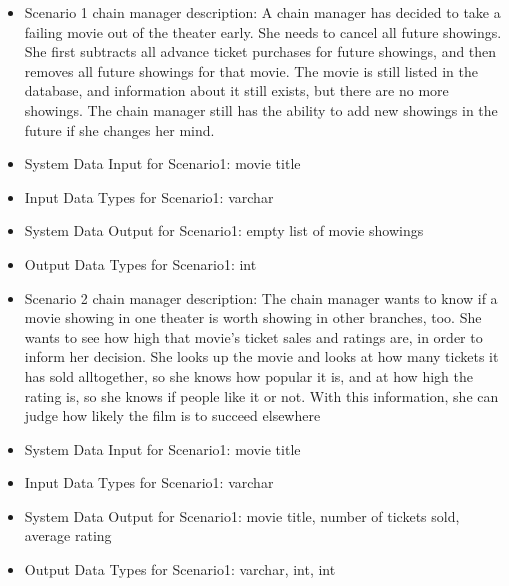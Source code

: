 {\begin{itemize}
\begin{itemize}
\begin{itemize}
	\item{Scenario 1 chain manager description: }
	A chain manager has decided to take a failing movie out of the theater early.  She needs to cancel all future showings.  She first subtracts all advance ticket purchases for future showings, and then removes all future showings for that movie.  The movie is still listed in the database, and information about it still exists, but there are no more showings.  The chain manager still has the ability to add new showings in the future if she changes her mind.
	\item{System Data Input for Scenario1: }
	movie title
	\item{Input Data Types for Scenario1: }
	varchar
	\item{System Data Output for Scenario1: }
	empty list of movie showings 
	\item{Output Data Types for Scenario1: }
	int
	\end{itemize}
	\begin{itemize} 
	\item{Scenario 2 chain manager description: }
	The chain manager wants to know if a movie showing in one theater is worth showing in other branches, too.  She wants to see how high that movie's ticket sales and ratings are, in order to inform her decision.  She looks up the movie and looks at how many tickets it has sold alltogether, so she knows how popular it is, and at how high the rating is, so she knows if people like it or not.  With this information, she can judge how likely the film is to succeed elsewhere
	\item{System Data Input for Scenario1: }
	movie title 
	\item{Input Data Types for Scenario1: }
	varchar
	\item{System Data Output for Scenario1: }
	movie title, number of tickets sold, average rating
	\item{Output Data Types for Scenario1: }
	varchar, int, int
	\end{itemize}
	\end{itemize}
\end{itemize}
}
